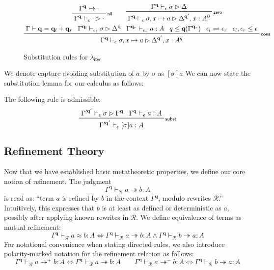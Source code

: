 \documentclass[acmsmall,screen,review]{acmart}
\newcommand{\mc}[1]{\ensuremath{\mathcal{#1}}}
\newcommand{\mb}[1]{\ensuremath{\mathbf{#1}}}
\newcommand{\ms}[1]{\ensuremath{\mathsf{#1}}}
\newcommand{\qsp}[4]{#1 \vdash #2 = #3 + #4}
\newcommand{\cwk}[2]{#1 \mapsto #2}
\newcommand{\rle}[1]{{\scriptsize\textsf{#1}}}
\newcommand{\hasty}[4]{#1 \vdash_{#2} #3: {#4}}
\newcommand{\issubst}[4]{#1 \vdash_{#2} #3 \rhd #4}
\newcommand{\teqv}{\approx}
\newcommand{\tref}{\twoheadrightarrow}
\newcommand{\tmle}[5]{#1 \vdash_{#2} #3 \tref #4 : {#5}}
\newcommand{\tmlep}[6]{#1 \vdash_{#2} #3 \tref^{#6} #4 : {#5}}
\newcommand{\tmeq}[5]{#1 \vdash_{#2} #3 \teqv #4 : {#5}}
\newcommand{\subiterexp}{\(\lambda_{\ms{iter}}\)}
\newcommand{\slides}{\rightleftharpoons}
\newcommand{\alquant}{\ms{q}}
\begin{document}
\begin{figure}
  \begin{gather*}
    \prftree[r]{\rle{nil}}{\cwk{\Gamma^{\mb{q}}}{\cdot}}
                              {\issubst{\Gamma^{\mb{q}}}{\epsilon}{\cdot}{\cdot}} \qquad 
    \prftree[r]{\rle{zero}}
      {\issubst{\Gamma^{\mb{q}}}{\epsilon}{\sigma}{\Delta}}
      {\issubst{\Gamma^{\mb{q}}}{\epsilon}{\sigma, x \mapsto a}{\Delta^{\mb{q}'}, x : A^0}}
    \\
    \prftree[r]{\rle{cons}}
      {\qsp{\Gamma}{\mb{q}}{\mb{q}_l}{\mb{q}_r}}
      {\issubst{\Gamma^{\mb{q_l}}}{\epsilon_l}{\sigma}{\Delta^{\mb{q}}}}
      {\hasty{\Gamma^{\mb{q}_r}}{\epsilon_r}{a}{A}}
      {q \leq \alquant(\Gamma^{\mb{q}_r})}
      {\epsilon_l \slides \epsilon_r}
      {\epsilon_l, \epsilon_r \leq \epsilon}
      {\issubst{\Gamma^{\mb{q}}}{\epsilon}{\sigma, x \mapsto a}
      {\Delta^{\mb{q}'}, x : A^q}}
  \end{gather*}
  \caption{Substitution rules for \subiterexp{}}
  \Description{}
  \label{fig:expr-subst}
\end{figure}%
We denote capture-avoiding substitution of $a$ by $\sigma$ as $[\sigma]a$ We can now state the
substitution lemma for our calculus as follows:
\begin{lemma}[name=Substitution, restate=synmonsubst]
  The following rule is admissible:
  \begin{equation*}
    \prftree[r]{\rle{subst}}
      {\issubst{\Gamma'^{\mb{q}'}}{\epsilon}{\sigma}{\Gamma^{\mb{q}}}}
      {\hasty{\Gamma^{\mb{q}}}{\epsilon}{a}{A}}
      {\hasty{\Gamma'^{\mb{q}'}}{\epsilon}{[\sigma]a}{A}}
  \end{equation*}
\end{lemma}

\subsection{Refinement Theory}


Now that we have established basic metatheoretic properties, we define our core notion of
refinement. The judgment
\begin{equation*}
  \tmle{\Gamma^{\mb{q}}}{\mc{R}}{a}{b}{A}
\end{equation*}
is read as: ``term $a$ is refined by $b$ in the context $\Gamma^{\mb{q}}$, modulo rewrites
$\mc{R}$.'' Intuitively, this expresses that $b$ is at least as defined or deterministic as $a$,
possibly after applying known rewrites in $\mc{R}$. We define equivalence of terms as mutual
refinement:
\begin{equation}
  \tmeq{\Gamma^{\mb{q}}}{\mc{R}}{a}{b}{A}
  \iff \tmle{\Gamma^{\mb{q}}}{\mc{R}}{a}{b}{A} 
  \land \tmle{\Gamma^{\mb{q}}}{\mc{R}}{b}{a}{A}
\end{equation}
For notational convenience when stating directed rules, we also introduce polarity-marked notation
for the refinement relation as follows:
\begin{equation*}
  \tmlep{\Gamma^{\mb{q}}}{\mc{R}}{a}{b}{A}{+} \iff \tmle{\Gamma^{\mb{q}}}{\mc{R}}{a}{b}{A} \qquad
  \tmlep{\Gamma^{\mb{q}}}{\mc{R}}{a}{b}{A}{-} \iff \tmle{\Gamma^{\mb{q}}}{\mc{R}}{b}{a}{A}
\end{equation*}
\end{document}
